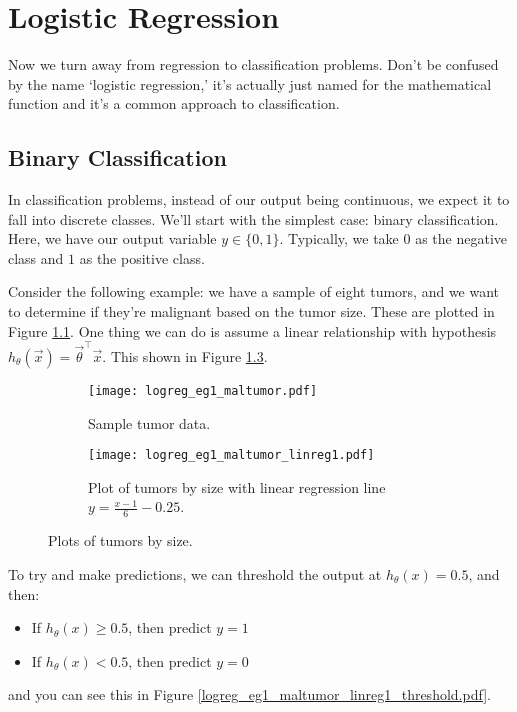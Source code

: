 \chapter{Logistic Regression}

Now we turn away from regression to classification problems. Don't be confused by the name `logistic regression,' it's actually just named for the mathematical function and it's a common approach to classification.

\section{Binary Classification}
In classification problems, instead of our output being continuous, we expect it to fall into discrete classes. We'll start with the simplest case: binary classification. Here, we have our output variable $y \in \{0, 1\}$. Typically, we take $0$ as the negative class and $1$ as the positive class. 

Consider the following example: we have a sample of eight tumors, and we want to determine if they're malignant based on the tumor size. These are plotted in Figure \ref{logreg-eg-maltumor-noregline}. One thing we can do is assume a linear relationship with hypothesis $h_\theta\left( \vec{x} \right) = \vec{\theta}^\intercal \vec{x}$. This shown in Figure \ref{logreg_eg1_maltumor_linreg1}.

\begin{figure}[h]
	\centering
	\begin{subfigure}[t]{0.45\textwidth}
   		\centering
    		\graphicspath{{./Figures/}}
  		\texttt{[image: logreg\_eg1\_maltumor.pdf]} 
   		\caption[]{Sample tumor data.}
   		\label{logreg-eg-maltumor-noregline}
	\end{subfigure}
	\begin{subfigure}[t]{0.45\textwidth}
   		\centering
    		\graphicspath{{./Figures/}}
   		\texttt{[image: logreg\_eg1\_maltumor\_linreg1.pdf]} 
   		\caption[]{Plot of tumors by size with linear regression line $y =  \frac{x-1}{6} - 0.25$.}
   		\label{logreg_eg1_maltumor_linreg1}
	\end{subfigure}
	\caption[]{Plots of tumors by size.}
\end{figure}

To try and make predictions, we can threshold the output at $h_\theta\left( x \right) = 0.5$, and then:
\begin{itemize}
\item If $h_\theta\left(x\right) \geq 0.5$, then predict $y = 1$
\item If $h_\theta\left( x \right) < 0.5$, then predict $y = 0$
\end{itemize}
and you can see this in Figure \ref{logreg_eg1_maltumor_linreg1_threshold.pdf}.

